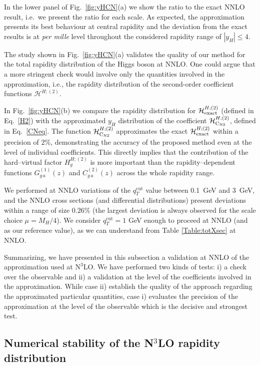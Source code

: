 \documentclass[12pt]{article}
\DeclareRobustCommand{\qtcut}{\ensuremath{q_T^\mathrm{cut}}\xspace}
\DeclareRobustCommand{\cH}{\ensuremath{\mathcal{H}}}
\DeclareRobustCommand{\N}[1]{\ensuremath{\text{N}^{#1}}} %
\begin{document}
In the lower panel of Fig.~\ref{fig:yHCN}(a) we show the ratio to the exact NNLO result, i.e.\ we present the ratio for each scale. As expected, the approximation presents its best behaviour at central rapidity and the deviation from the exact results is at \textit{per mille} level throughout the considered rapidity range of $|y_{H}|\leq 4$.

The study shown in Fig.~\ref{fig:yHCN}(a) validates the quality of our method for the total rapidity distribution of the Higgs boson at NNLO. One could argue that a more stringent check would involve only the quantities involved in the approximation, i.e., the rapidity distribution of the second-order coefficient functions $\cH^{H;(2)}$. 

In Fig.~\ref{fig:yHCN}(b) we compare the rapidity distribution for $\cH^{H;(2)}_{\rm exact}$ (defined in Eq.~\eqref{H2}) with the approximated $y_{H}$ distribution of the coefficient $\cH^{H;(2)}_{\rm C_{N2}}$, defined in Eq.~\eqref{CNeq}. The function $\cH^{H;(2)}_{\rm C_{N2}}$ approximates the exact $\cH^{H;(2)}_{\rm exact}$  within a precision of $2\%$, demonstrating the accuracy of the proposed method even at the level of individual coefficients. This directly implies that the contribution of the hard--virtual factor $H^{H;(2)}_g$ is more important than the rapidity--dependent functions $G^{(1)}_{g\,a}(z)$ and $C^{(2)}_{g\,a}(z)$ across the whole rapidity range.

We performed at NNLO variations of the $\qtcut$ value between 0.1~GeV and 3~GeV, and the NNLO cross sections (and differential distributions) present deviations within a range of size $0.26\%$  (the largest deviation is always observed for the scale choice $\mu=M_{H}/4$).  We consider $\qtcut=1$ GeV enough to proceed at NNLO (and as our reference value), as we can understand from Table \ref{Table:totXsec} at NNLO.

Summarizing, we have presented in this subsection a validation at NNLO of the approximation used at \N3LO. We have performed two kinds of tests: i) a check over the observable and ii) a validation at the level of the coefficients involved in the approximation. While case ii) establish the quality of the approach regarding the approximated particular quantities, case i) evaluates the precision of the approximation at the level of the observable which is the decisive and strongest test. 


\subsection{Numerical stability of the \texorpdfstring{N${}^\text{3}$LO}{N3LO} rapidity distribution}
\label{sec:N3LOrap}
\end{document}
